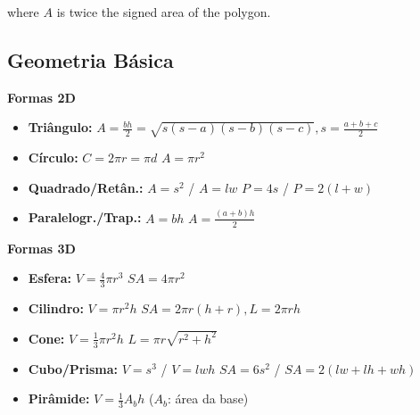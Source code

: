 where $A$ is twice the signed area of the polygon.

\subsection{Geometria Básica}

\textbf{Formas 2D}
\begin{itemize}[leftmargin=*, nosep]
    \item \textbf{Triângulo:} $A = \frac{bh}{2} = \sqrt{s(s-a)(s-b)(s-c)}, s = \frac{a+b+c}{2}$
    \item \textbf{Círculo:} $C = 2\pi r = \pi d$ \hfill $A = \pi r^2$
    \item \textbf{Quadrado/Retân.:} $A = s^2$ / $A = lw$ \hfill $P = 4s$ / $P = 2(l+w)$
    \item \textbf{Paralelogr./Trap.:} $A = bh$ \hfill $A = \frac{(a+b)h}{2}$
\end{itemize}

\textbf{Formas 3D}
\begin{itemize}[leftmargin=*, nosep]
    \item \textbf{Esfera:} $V = \frac{4}{3}\pi r^3$ \hfill $SA = 4\pi r^2$
    \item \textbf{Cilindro:} $V = \pi r^2 h$ \hfill $SA = 2\pi r(h+r), L = 2\pi rh$
    \item \textbf{Cone:} $V = \frac{1}{3}\pi r^2 h$ \hfill $L = \pi r \sqrt{r^2+h^2}$
    \item \textbf{Cubo/Prisma:} $V = s^3$ / $V = lwh$ \hfill $SA = 6s^2$ / $SA = 2(lw+lh+wh)$
    \item \textbf{Pirâmide:} $V = \frac{1}{3} A_b h$ ($A_b$: área da base)
\end{itemize}
